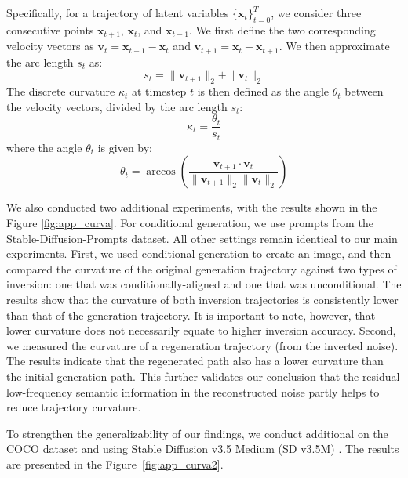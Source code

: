 \documentclass{article}
\begin{document}
Specifically, for a trajectory of latent variables $\{\boldsymbol{x}_t\}_{t=0}^T$, we consider three consecutive points $\boldsymbol{x}_{t+1}$, $\boldsymbol{x}_t$, and $\boldsymbol{x}_{t-1}$. We first define the two corresponding velocity vectors as $\boldsymbol{v}_t = \boldsymbol{x}_{t-1} - \boldsymbol{x}_t$ and $\boldsymbol{v}_{t+1} = \boldsymbol{x}_t - \boldsymbol{x}_{t+1}$. We then approximate the arc length $s_t$ as:
\begin{equation}
    s_t = \|\boldsymbol{v}_{t+1}\|_2 + \|\boldsymbol{v}_t\|_2
    \label{eq:arc_length}
\end{equation}
The discrete curvature $\kappa_t$ at timestep $t$ is then defined as the angle $\theta_t$ between the velocity vectors, divided by the arc length $s_t$:
\begin{equation}
    \kappa_t = \frac{\theta_t}{s_t}
    \label{eq:curvature}
\end{equation}
where the angle $\theta_t$ is given by:
\begin{equation}
    \theta_t = \arccos\left( \frac{\boldsymbol{v}_{t+1} \cdot \boldsymbol{v}_t}{\|\boldsymbol{v}_{t+1}\|_2 \|\boldsymbol{v}_t\|_2} \right)
    \label{eq:angle}
\end{equation}

We also conducted two additional experiments, with the results shown in the Figure \ref{fig:app_curva}. 
For conditional generation, we use prompts from the Stable-Diffusion-Prompts dataset. All other settings remain identical to our main experiments.
First, we used conditional generation to create an image, and then compared the curvature of the original generation trajectory against two types of inversion: one that was conditionally-aligned and one that was unconditional. The results show that the curvature of both inversion trajectories is consistently lower than that of the generation trajectory. It is important to note, however, that lower curvature does not necessarily equate to higher inversion accuracy.
Second, we measured the curvature of a regeneration trajectory (from the inverted noise). The results indicate that the regenerated path also has a lower curvature than the initial generation path. This further validates our conclusion that the residual low-frequency semantic information in the reconstructed noise partly helps to reduce trajectory curvature.

To strengthen the generalizability of our findings, we conduct additional on the COCO dataset and using Stable Diffusion v3.5 Medium (SD v3.5M) \citep{sd3_2024}. The results are presented in the Figure~\ref{fig:app_curva2}.
\end{document}
